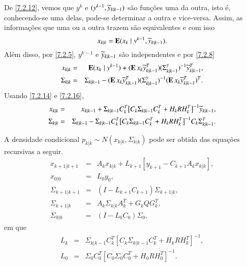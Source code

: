 De \eqref{7.2.12}, vemos que $y^k$ e $(y^{k-1},\widetilde y_{k|k-1})$ são funções uma da outra, isto é, conhecendo-se uma delas, pode-se determinar a outra e vice-versa. Assim, as informações que uma ou a outra trazem são equivalentes e com isso
\[
x_{k|k}=\operatorname{\bf E}(x_k\;|\;y^{k-1},\widetilde y_{k|k-1}).
\]
Além disso, por \eqref{7.2.5}, $y^{k-1}$ e $\widetilde y_{k|k-1}$ são independentes e por \eqref{7.2.8}
\begin{eqnarray}
x_{k|k} &=&	\operatorname{\bf E}(x_k\;|\;y^{k-1}) + (\operatorname{\bf E} x_k\widetilde y_{k|k-1}^T)(\Sigma_{k|k-1}^y)^{-1} \widetilde y_{k|k-1}^T,\label{7.2.17}\\
\Sigma_{k|k} &=& \Sigma_{k|k-1} - (\operatorname{\bf E} x_k\widetilde y_{k|k-1}^T)(\Sigma_{k|k-1}^y)^{-1}(\operatorname{\bf E} x_k\widetilde y_{k|k-1}^T)^T. \label{7.2.18}
\end{eqnarray}
Usando \eqref{7.2.14} e \eqref{7.2.16},
\begin{eqnarray}
x_{k|k} &=&	x_{k|k-1}+\Sigma_{k|k-1}C_k^T\big[C_k\Sigma_{k|k-1}C_k^T+H_kRH_k^T\big]^{-1}\widetilde y_{k|k-1},
\label{7.2.19}\\
\Sigma_{k|k} &=& \Sigma_{k|k-1} - \Sigma_{k|k-1}C_k^T\big[C_k\Sigma_{k|k-1}C_k^T+H_kRH_k^T\big]^{-1}C_k\Sigma_{k|k-1}^T. \label{7.2.20}
\end{eqnarray}



\begin{Teo}\label{7.2.21}
A densidade condicional $p_{k|k}\sim N(x_{k|k}, \Sigma_{k|k})$ pode ser obtida das equações recursivas a seguir.
\begin{eqnarray}
x_{k+1|k+1} &=&A_kx_{k|k}+L_{k+1}[y_{k+1}-C_{k+1}A_kx_{k|k}]\label{7.2.22},\\
x_{0|0}&=& L_0y_0\label{7.2.23},\\
\Sigma_{k+1|k+1} &=& (I-L_{k+1}C_{k+1})\Sigma_{k+1|k}\label{7.2.24},\\
\Sigma_{k+1|k}&=& A_k\Sigma_{k|k}A_k^T+G_kQG_k^T\label{7.2.25},\\
\Sigma_{0|0} &=& (I-L_{0}C_{0})\Sigma_{0} \label{7.2.26},
\end{eqnarray}
em que
\begin{eqnarray}
L_{k}&=& \Sigma_{k|k-1}C_k^T[C_k\Sigma_{k|k-1}C_k^T+H_kRH_k^T]^{-1}\label{7.2.27},\\
L_0 &=& \Sigma_0C_0^T[C_0\Sigma_0C_0^T+H_0RH_0^T]^{-1} \label{7.2.28}.
\end{eqnarray}
\end{Teo}

